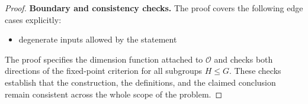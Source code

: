 \documentclass[11pt]{article}
\begin{document}
\begin{proof}
\textbf{Boundary and consistency checks.}
The proof covers the following edge cases explicitly:
\begin{itemize}[leftmargin=*]
\item degenerate inputs allowed by the statement
\end{itemize}
The proof specifies the dimension function attached to \(\mathcal O\) and checks both directions of the fixed-point criterion for all subgroups \(H\le G\). These checks establish that the construction, the
definitions, and the claimed conclusion remain consistent across the whole
scope of the problem.
\end{proof}
\end{document}

